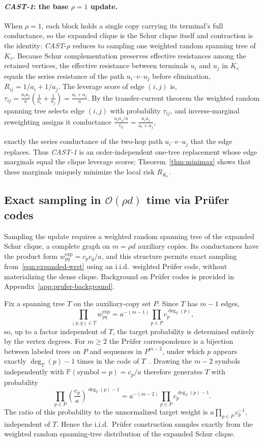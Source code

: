 \documentclass{article}
\newcommand{\CAST}{\textit{CAST}\xspace}
\newcommand{\CASTone}{\textit{CAST-1}\xspace}
\newcommand{\calO}{\mathcal{O}}
\newcommand{\bigO}{\calO}
\newcommand{\1}{\mathbbm{1}}
\theoremstyle{plain}
\renewcommand{\Pr}[1]{\mathbb{P}\left(#1\right)}
\begin{document}
\paragraph{\CASTone: the base $\rho=1$ update.}
When $\rho=1$, each block holds a single copy carrying its terminal's
full conductance, so the expanded clique is the Schur clique itself and
contraction is the identity: \CAST-$\rho$ reduces to sampling one
weighted random spanning tree of $K_v$. Because Schur complementation
preserves effective resistances among the retained vertices, the
effective resistance between terminals $u_i$ and $u_j$ in $K_v$ equals
the series resistance of the path $u_i$--$v$--$u_j$ before elimination,
$R_{ij}=1/a_i+1/a_j$. The leverage score of edge $(i,j)$ is,
$
  \tau_{ij} = \frac{a_ia_j}{a}\left(\frac{1}{a_i}+\frac{1}{a_j}\right)
  = \frac{a_i+a_j}{a}.
$
By the transfer-current theorem the weighted random spanning tree selects edge $(i,j)$ with
probability $\tau_{ij}$, and inverse-marginal reweighting assigns it
conductance
$\frac{a_ia_j/a}{\tau_{ij}}=\frac{a_ia_j}{a_i+a_j}$,

exactly the series conductance of the two-hop path $u_i$--$v$--$u_j$
that the edge replaces. Thus \CASTone{} is an order-independent
one-tree replacement whose edge marginals equal the clique leverage
scores; Theorem~\ref{thm:minimax} shows that these marginals uniquely
minimize the local risk $R_{K_v}$.


\subsection{Exact sampling in $\bigO(\rho d)$ time via Pr\"ufer codes}
\label{sec:prufer}

Sampling the update requires a weighted random spanning tree of the
expanded Schur clique, a complete graph on $m=\rho d$ auxiliary copies.
Its conductances have the product form
$w^{\mathrm{exp}}_{pq}=c_pc_q/a$, and this structure permits exact
sampling from~\eqref{eqn:expanded-wrst} using an i.i.d.\ weighted
Pr\"ufer code, without materializing the dense clique. Background on
Pr\"ufer codes is provided in
Appendix~\ref{app:prufer-background}.

Fix a spanning tree $T$ on the auxiliary-copy set $P$. Since $T$ has $m-1$ edges,
\[
  \prod_{(p,q)\in T} w_{pq}^{\mathrm{exp}}
  = a^{-(m-1)}\prod_{p\in P}c_p^{\deg_T(p)},
\]
so, up to a factor independent of $T$, the target probability is
determined entirely by the vertex degrees. For $m\geq 2$ the Pr\"ufer
correspondence is a bijection between labeled trees on $P$ and
sequences in $P^{m-2}$, under which $p$ appears exactly
$\deg_T(p)-1$ times in the code of
$T$~\cite{aigner1999proofs,west2001introduction}. Drawing the $m-2$
symbols independently with $\Pr{\text{symbol}=p}=c_p/a$ therefore
generates $T$ with probability
\[
  \prod_{p\in P}\left(\frac{c_p}{a}\right)^{\deg_T(p)-1}
  = a^{-(m-2)}\prod_{p\in P}c_p^{\deg_T(p)-1}.
\]
The ratio of this probability to the unnormalized target weight is
$a\prod_{p\in P}c_p^{-1}$, independent of $T$. Hence the i.i.d.\
Pr\"ufer construction samples exactly from the weighted random
spanning-tree distribution of the expanded Schur clique.
\end{document}
